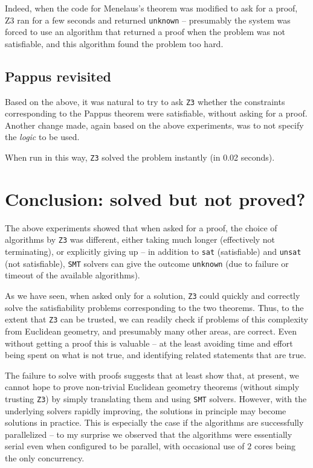 \documentclass{amsart}
\theoremstyle{plain}
\theoremstyle{definition}
\theoremstyle{remark}
\begin{document}
Indeed, when the code for Menelaus's theorem was modified to ask for a
proof, Z3 ran for a few seconds and returned \texttt{unknown} --
presumably the system was forced to use an algorithm that returned a
proof when the problem was not satisfiable, and this algorithm found the
problem too hard.

\subsection{Pappus revisited}

Based on the above, it was natural to try to ask \texttt{Z3} whether the
constraints corresponding to the Pappus theorem were satisfiable,
without asking for a proof. Another change made, again based on the
above experiments, was to not specify the \emph{logic} to be used.

When run in this way, \texttt{Z3} solved the problem instantly (in 0.02 seconds).



\section{Conclusion: solved but not proved?}

The above experiments showed that when asked for a proof, the choice of algorithms by \texttt{Z3}
was different, either taking much longer (effectively not terminating),
or explicitly giving up -- in addition to \texttt{sat} (satisfiable) and
\texttt{unsat} (not satisfiable), \texttt{SMT} solvers can give the outcome
\texttt{unknown} (due to failure or timeout of the available
algorithms).

As we have seen, when asked only for a solution, \texttt{Z3} could quickly and correctly solve the 
satisfiability problems corresponding to the two theorems.
Thus, to the extent that \texttt{Z3} can be trusted, we can readily check if
problems of this complexity from Euclidean geometry, and presumably many
other areas, are correct. Even without getting a proof this is valuable
-- at the least avoiding time and effort being spent on what is not
true, and identifying related statements that are true.

The failure to solve with proofs suggests that at least show that, at present, we cannot hope to
prove non-trivial Euclidean geometry theorems (without simply trusting \texttt{Z3}) by simply translating
them and using \texttt{SMT} solvers. However, with the underlying solvers rapidly
improving, the solutions in principle may become solutions in practice.
This is especially the case if the algorithms are successfully
parallelized -- to my surprise we observed that the algorithms were
essentially serial even when configured to be parallel, with occasional
use of \(2\) cores being the only concurrency.
\end{document}
